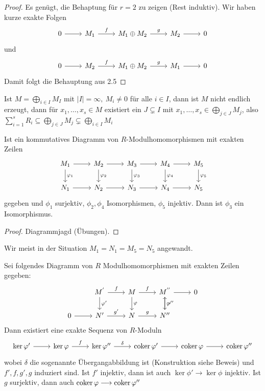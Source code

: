 \begin{proof}
	Es genügt, die Behaptung für $r=2$ zu zeigen (Rest induktiv). Wir haben kurze exakte Folgen $$\begin{tikzcd}
	0  \arrow{r} & M_1 \arrow{r}{f} & M_1 \oplus M_2 \arrow{r}{g} & M_2 \arrow{r} & 0
	\end{tikzcd} $$
	 und
	$$\begin{tikzcd}
	0  \arrow{r} & M_2 \arrow{r}{f} & M_1 \oplus M_2 \arrow{r}{g} & M_1 \arrow{r} & 0
	\end{tikzcd} $$
	Damit folgt die Behauptung aus 2.5
\end{proof}
\begin{anm}
	Ist $M= \bigoplus_{i\in I} M_I$ mit $|I| = \infty, \ M_i \neq 0$ für alle $i\in I$, dann ist $M$ nicht endlich erzeugt, dann für $x_1, \ldots, x_s\in M$ existiert ein $J\subsetneq I$ mit $ x_1, \ldots, x_s \in \bigoplus_{j\in J} M_j$, also $\sum_{i=1}^s R_i \subseteq \bigoplus_{j\in J} M_j\subsetneq \bigoplus_{i\in I} M_i$
\end{anm}
\begin{bem}[Fünferlemma] Ist ein kommutatives Diagramm von $R$-Modulhomomorphismen mit exakten Zeilen 
	$$\begin{tikzcd}
	M_1 \arrow{r} \arrow{d}{\phi_1}& M_2 \arrow{r}\arrow{d}{\phi_2}& M_3 \arrow{r} \arrow{d}{\phi_3} & M_4 \arrow{r} \arrow{d}{\phi_4} & M_5 \arrow{d}{\phi_5}\\
	N_1 \arrow{r}& N_2 \arrow{r}& N_3 \arrow{r} & N_4 \arrow{r} & N_5
	\end{tikzcd}$$
	gegeben und $\phi_1$ surjektiv, $\phi_2, \phi_4$ Isomorphismen, $\phi_5$ injektiv. Dann ist $\phi_3$ ein Isomorphismus.
\end{bem}
\begin{proof}
	Diagrammjagd (Übungen).
\end{proof}
\begin{anm}
	Wir meist in der Situation $M_1 = N_1 = M_5 = N_5$ angewandt.
\end{anm}
\begin{bem}[Schlangenlemma]
	Sei folgendes Diagramm von $R$ Modulhomomorphismen mit exakten Zeilen gegeben:
	$$\begin{tikzcd}
& M^{'} \arrow{r}{f}\arrow{d}{\phi'}& M \arrow{r}{f} \arrow{d}{\phi} & M^{''} \arrow{d}{\phi''} \arrow{r}& 0\\
	0 \arrow{r}& N' \arrow{r}{g'}& N \arrow{r}{g} & \arrow{u}[swap]{\sim}N''
	\end{tikzcd}$$
	Dann existiert eine exakte Sequenz von $R$-Moduln 
	$$\begin{tikzcd}
	\ker \phi'  \arrow{r} & \ker \phi \arrow{r}{f} & \ker \phi'' \arrow{r}{\delta} & \coker \phi'  \arrow{r} &  \coker \phi \arrow{r} & \coker \phi''
	\end{tikzcd} $$
	wobei $\delta$ die sogenannte Übergangabbildung ist (Konstruktion siehe Beweis) und $f',f,g',g$ induziert sind. Ist $f'$ injektiv, dann ist auch $\ker \phi' \longrightarrow \ker \phi$ injektiv. Ist $g$ surjektiv, dann auch $\operatorname{coker} \varphi \longrightarrow \operatorname{coker} \varphi''$
	
\end{bem}
